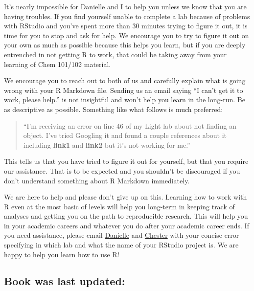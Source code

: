 \documentclass[]{tufte-book}
\begin{document}
It's nearly impossible for Danielle and I to help you unless we know
that you are having troubles. If you find yourself unable to complete a
lab because of problems with RStudio and you've spent more than 30
minutes trying to figure it out, it is time for you to stop and ask for
help. We encourage you to try to figure it out on your own as much as
possible because this helps you learn, but if you are deeply entrenched
in not getting R to work, that could be taking away from your learning
of Chem 101/102 material.

We encourage you to reach out to both of us and carefully explain what
is going wrong with your R Markdown file. Sending us an email saying ``I
can't get it to work, please help.'' is not insightful and won't help
you learn in the long-run. Be as descriptive as possible. Something like
what follows is much preferred: \vspace{0.1in}

\begin{quote}
``I'm receiving an error on line 46 of my Light lab about not finding an
object. I've tried Googling it and found a couple references about it
including \textbf{link1} and \textbf{link2} but it's not working for
me.''
\end{quote}

\vspace{0.1in}

This tells us that you have tried to figure it out for yourself, but
that you require our assistance. That is to be expected and you
shouldn't be discouraged if you don't understand something about R
Markdown immediately.

We are here to help and please don't give up on this. Learning how to
work with R even at the most basic of levels will help you long-term in
keeping track of analyses and getting you on the path to reproducible
research. This will help you in your academic careers and whatever you
do after your academic career ends. If you need assistance, please email
\href{dcass@reed.edu}{Danielle} and \href{cismay@reed.edu}{Chester} with
your concise error specifying in which lab and what the name of your
RStudio project is. We are happy to help you learn how to use R!

\subsection*{Book was last updated:}\label{book-was-last-updated}
\end{document}
